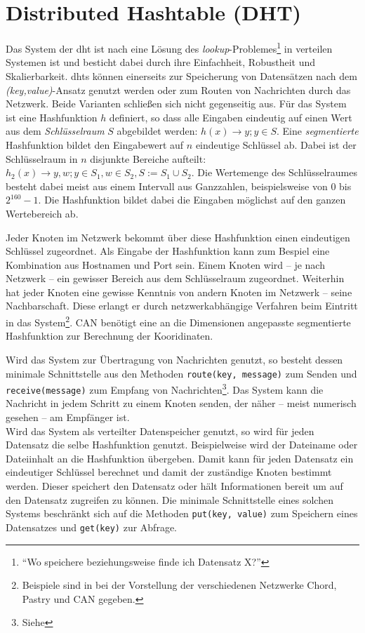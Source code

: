 \chapter{Distributed Hashtable (DHT)}
\label{chap:dht}

Das System der \acf{dht} ist nach \cite{Wehrle2005} eine Lösung des \emph{lookup}-Problemes\footnote{``Wo speichere beziehungsweise finde ich Datensatz X?''} in verteilen Systemen ist und besticht dabei durch ihre Einfachheit, Robustheit und Skalierbarkeit. \acp{dht} können einerseits zur Speicherung von Datensätzen nach dem \emph{(key,value)}-Ansatz genutzt werden oder zum Routen von Nachrichten durch das Netzwerk. Beide Varianten schließen sich nicht gegenseitig aus. Für das System ist eine Hashfunktion $h$ definiert, so dass alle Eingaben eindeutig auf einen Wert aus dem \emph{Schlüsselraum} $S$ abgebildet werden: $h(x) \rightarrow y; y \in S$. Eine \emph{segmentierte} Hashfunktion bildet den Eingabewert auf $n$ eindeutige Schlüssel ab. Dabei ist der Schlüsselraum in $n$ disjunkte Bereiche aufteilt: $h_2(x) \rightarrow y,w; y \in S_1, w \in S_2, S := S_1 \cup S_2$. Die Wertemenge des Schlüsselraumes besteht dabei meist aus einem Intervall aus Ganzzahlen, beispielsweise von $0$ bis $2^{160}-1$. Die Hashfunktion bildet dabei die Eingaben möglichst auf den ganzen Wertebereich ab.

Jeder Knoten im Netzwerk bekommt über diese Hashfunktion einen eindeutigen Schlüssel zugeordnet. Als Eingabe der Hashfunktion kann zum Bespiel eine Kombination aus Hostnamen und Port sein. Einem Knoten wird -- je nach Netzwerk -- ein gewisser Bereich aus dem Schlüsselraum zugeordnet. Weiterhin hat jeder Knoten eine gewisse Kenntnis von andern Knoten im Netzwerk -- seine Nachbarschaft. Diese erlangt er durch netzwerkabhängige Verfahren beim Eintritt in das System\footnote{Beispiele sind in  bei der Vorstellung der verschiedenen Netzwerke Chord, Pastry und CAN gegeben.}. CAN benötigt eine an die Dimensionen angepasste segmentierte Hashfunktion zur Berechnung der Kooridinaten.

Wird das System zur Übertragung von Nachrichten genutzt, so besteht dessen minimale Schnittstelle aus den Methoden \texttt{route(key, message)} zum Senden und \texttt{receive(message)} zum Empfang von Nachrichten\footnote{Siehe }. Das System kann die Nachricht in jedem Schritt zu einem Knoten senden, der näher -- meist numerisch gesehen -- am Empfänger ist.\\
Wird das System als verteilter Datenspeicher genutzt, so wird für jeden Datensatz die selbe Hashfunktion genutzt. Beispielweise wird der Dateiname oder Dateiinhalt an die Hashfunktion übergeben. Damit kann für jeden Datensatz ein eindeutiger Schlüssel berechnet und damit der zuständige Knoten bestimmt werden. Dieser speichert den Datensatz oder hält Informationen bereit um auf den Datensatz zugreifen zu können. Die minimale Schnittstelle eines solchen Systems beschränkt sich auf die Methoden \texttt{put(key, value)} zum Speichern eines Datensatzes und \texttt{get(key)} zur Abfrage.
